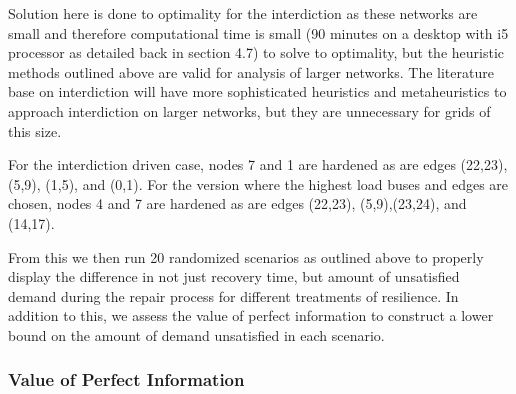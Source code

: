 \documentclass{article}
\begin{document}
	Solution here is done to optimality for the interdiction as these networks are small and therefore computational time is small (90 minutes on a desktop with i5 processor as detailed back in section 4.7) to solve to optimality, but the heuristic methods outlined above are valid for analysis of larger networks. The literature base on interdiction will have more sophisticated heuristics and metaheuristics to approach interdiction on larger networks, but they are unnecessary for grids of this size.
	
	For the interdiction driven case, nodes 7 and 1 are hardened as are edges (22,23), (5,9), (1,5), and (0,1). For the version where the highest load buses and edges are chosen, nodes 4 and 7 are hardened as are edges (22,23), (5,9),(23,24), and (14,17).
	
	From this we then run 20 randomized scenarios as outlined above to properly display the difference in not just recovery time, but amount of unsatisfied demand during the repair process for different treatments of resilience. In addition to this, we assess the value of perfect information to construct a lower bound on the amount of demand unsatisfied in each scenario.
	
	\subsubsection{Value of Perfect Information}
	
\end{document}
